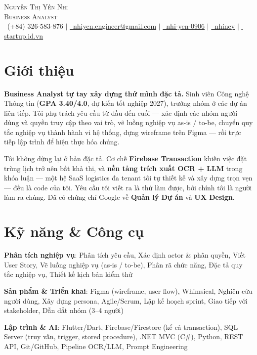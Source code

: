 \documentclass[a4paper,9pt]{extarticle}
\begin{document}
\begin{center}
  {\Huge\scshape Nguyễn Thị Yến Nhi}\\ \vspace{3pt}
  {\large\scshape Business Analyst}\\ \vspace{5pt}
  \small
  \, (+84) 326-583-876 $|$
  \href{mailto:nhiyen.engineer@gmail.com}{\, nhiyen.engineer@gmail.com} $|$
  \href{https://linkedin.com/in/nhi-yen-0906}{\, nhi-yen-0906} $|$
  \href{https://github.com/nhiney}{\, nhiney} $|$
  \href{https://startup.id.vn/}{\, startup.id.vn}
\end{center}

\section{Giới thiệu}
\begin{cvPlain}
  \item \textbf{Business Analyst tự tay xây dựng thứ mình đặc tả.} Sinh viên Công nghệ Thông tin (\textbf{GPA 3.40/4.0}, dự kiến tốt nghiệp 2027), trưởng nhóm ở các dự án liên tiếp. Tôi phụ trách yêu cầu từ đầu đến cuối — xác định các nhóm người dùng và quyền truy cập theo vai trò, vẽ luồng nghiệp vụ as-is / to-be, chuyển quy tắc nghiệp vụ thành hành vi hệ thống, dựng wireframe trên Figma — rồi trực tiếp lập trình để hiện thực hóa chúng.
  \item Tôi không dừng lại ở bản đặc tả. Cơ chế \textbf{Firebase Transaction} khiến việc đặt trùng lịch trở nên bất khả thi, và \textbf{nền tảng trích xuất OCR + LLM} trong khóa luận — một hệ SaaS logistics đa tenant tôi tự thiết kế và xây dựng trọn vẹn — đều là code của tôi. Yêu cầu tôi viết ra là thứ làm được, bởi chính tôi là người làm ra chúng. Đã có chứng chỉ Google về \textbf{Quản lý Dự án} và \textbf{UX Design}.
\end{cvPlain}

\section{Kỹ năng \& Công cụ}
\begin{cvPlain}
  \item \textbf{Phân tích nghiệp vụ}{: Phân tích yêu cầu, Xác định actor \& phân quyền, Viết User Story, Vẽ luồng nghiệp vụ (as-is / to-be), Phân rã chức năng, Đặc tả quy tắc nghiệp vụ, Thiết kế kịch bản kiểm thử}
  \item \textbf{Sản phẩm \& Triển khai}{: Figma (wireframe, user flow), Whimsical, Nghiên cứu người dùng, Xây dựng persona, Agile/Scrum, Lập kế hoạch sprint, Giao tiếp với stakeholder, Dẫn dắt nhóm (3--4 người)}
  \item \textbf{Lập trình \& AI}{: Flutter/Dart, Firebase/Firestore (kể cả transaction), SQL Server (truy vấn, trigger, stored procedure), .NET MVC (C\#), Python, REST API, Git/GitHub, Pipeline OCR/LLM, Prompt Engineering}
\end{cvPlain}
\end{document}
